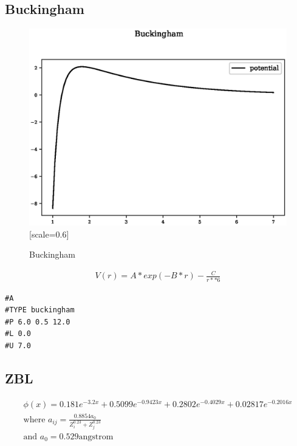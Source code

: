 \documentclass[12pt,twoside]{manual}
\begin{document}
\begin{appendices}
\subsection{Buckingham}

\begin{figure}[h]
  \begin{center}
    \includegraphics{img/plots/buckingham.eps}[scale=0.6]
    \caption{Buckingham}
    \label{graph:graph1}
  \end{center}
\end{figure}

\begin{equation}
\begin{split}
V(r) = A * exp(-B * r) - \frac{C}{r**6}
\end{split}
\label{eq:eqBuckingham}
\end{equation}

\begin{lstlisting}[style=pseudocode,caption={Buckingham}]
#A
#TYPE buckingham
#P 6.0 0.5 12.0
#L 0.0
#U 7.0
\end{lstlisting}





\subsection{ZBL}

\begin{equation}
\begin{split}
\phi(x) = 0.181 e^{-3.2x} + 0.5099 e^{-0.9423x} + 0.2802 e^{-0.4029x} + 0.02817 e^{-0.2016x} \\
\text{where } a_{ij} = \frac{0.8854 a_0}{Z^{0.23}_i + Z^{0.23}_j} \\
\text{and } a_0 = 0.529 \text{angstrom}
\end{split}
\label{eq:screeningPotential}
\end{equation}







\end{appendices}
\end{document}
